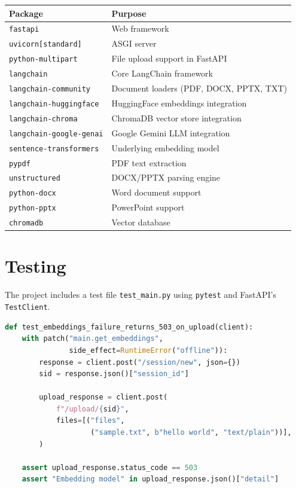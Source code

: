 \documentclass[12pt,a4paper]{article}
\begin{document}
\begin{longtable}{@{}p{4.5cm}p{9cm}@{}}
\toprule
\textbf{Package} & \textbf{Purpose} \\
\midrule
\endhead
\texttt{fastapi} & Web framework \\
\texttt{uvicorn[standard]} & ASGI server \\
\texttt{python-multipart} & File upload support in FastAPI \\
\texttt{langchain} & Core LangChain framework \\
\texttt{langchain-community} & Document loaders (PDF, DOCX, PPTX, TXT) \\
\texttt{langchain-huggingface} & HuggingFace embeddings integration \\
\texttt{langchain-chroma} & ChromaDB vector store integration \\
\texttt{langchain-google-genai} & Google Gemini LLM integration \\
\texttt{sentence-transformers} & Underlying embedding model \\
\texttt{pypdf} & PDF text extraction \\
\texttt{unstructured} & DOCX/PPTX parsing engine \\
\texttt{python-docx} & Word document support \\
\texttt{python-pptx} & PowerPoint support \\
\texttt{chromadb} & Vector database \\
\bottomrule
\end{longtable}

\section{Testing}

The project includes a test file \texttt{test\_main.py} using \texttt{pytest} and FastAPI's \texttt{TestClient}.

\begin{lstlisting}[language=Python, caption={Test: embedding failure returns 503}]
def test_embeddings_failure_returns_503_on_upload(client):
    with patch("main.get_embeddings",
               side_effect=RuntimeError("offline")):
        response = client.post("/session/new", json={})
        sid = response.json()["session_id"]

        upload_response = client.post(
            f"/upload/{sid}",
            files=[("files",
                    ("sample.txt", b"hello world", "text/plain"))],
        )

    assert upload_response.status_code == 503
    assert "Embedding model" in upload_response.json()["detail"]
\end{lstlisting}
\end{document}
